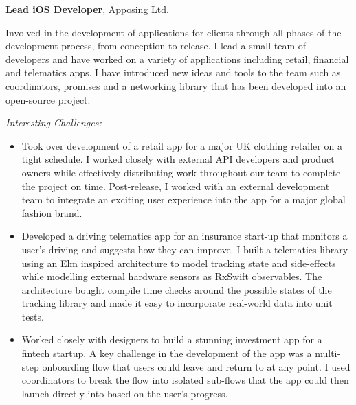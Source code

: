 %
\textbf{Lead iOS Developer}, Apposing Ltd. 

Involved in the development of applications for clients through all phases of
the development process, from conception to release. I lead a small team of
developers and have worked on a variety of applications including retail,
financial and telematics apps. I have introduced new ideas and tools to the team
such as coordinators, promises and a networking library that has been developed
into an open-source project.

\medskip

\textit{Interesting Challenges:}

\smallskip

\begin{itemize}
\item Took over development of a retail app for a major UK clothing retailer on
  a tight schedule. I worked closely with external API developers and product
  owners while effectively distributing work throughout our team to complete the
  project on time. Post-release, I worked with an external development team to
  integrate an exciting user experience into the app for a major global fashion
  brand.

\item Developed a driving telematics app for an insurance start-up that monitors
  a user's driving and suggests how they can improve. I built a telematics
  library using an Elm inspired architecture to model tracking state and
  side-effects while modelling external hardware sensors as RxSwift
  observables. The architecture bought compile time checks around the possible
  states of the tracking library and made it easy to incorporate real-world data
  into unit tests.

\item Worked closely with designers to build a stunning investment app for a
  fintech startup. A key challenge in the development of the app was a
  multi-step onboarding flow that users could leave and return to at any
  point. I used coordinators to break the flow into isolated sub-flows that the
  app could then launch directly into based on the user's progress.

\end{itemize}

\bigskip

